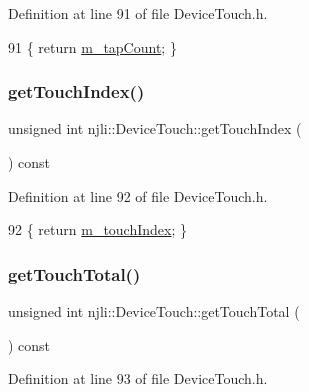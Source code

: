 Definition at line 91 of file Device\+Touch.\+h.


\begin{DoxyCode}
91 \{ \textcolor{keywordflow}{return} \mbox{\hyperlink{classnjli_1_1_device_touch_af4506b66dcc8e44597244c9a6827bd0d}{m\_tapCount}}; \}
\end{DoxyCode}
\mbox{\label{classnjli_1_1_device_touch_ae2c94bd858111f25c7f738ebc103ef21}} 
\subsubsection{\texorpdfstring{get\+Touch\+Index()}{getTouchIndex()}}
{\footnotesize\ttfamily unsigned int njli\+::\+Device\+Touch\+::get\+Touch\+Index (\begin{DoxyParamCaption}{ }\end{DoxyParamCaption}) const\hspace{0.3cm}{\ttfamily [inline]}}



Definition at line 92 of file Device\+Touch.\+h.


\begin{DoxyCode}
92 \{ \textcolor{keywordflow}{return} \mbox{\hyperlink{classnjli_1_1_device_touch_a8702a0eb417f912b2b8733b2f21a8060}{m\_touchIndex}}; \}
\end{DoxyCode}
\mbox{\label{classnjli_1_1_device_touch_a0e56cd03f8514af36b8d40151c913647}} 
\subsubsection{\texorpdfstring{get\+Touch\+Total()}{getTouchTotal()}}
{\footnotesize\ttfamily unsigned int njli\+::\+Device\+Touch\+::get\+Touch\+Total (\begin{DoxyParamCaption}{ }\end{DoxyParamCaption}) const\hspace{0.3cm}{\ttfamily [inline]}}



Definition at line 93 of file Device\+Touch.\+h.


